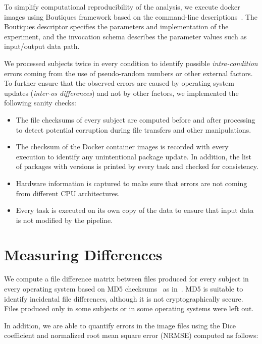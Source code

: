 \documentclass{article}
\begin{document}
{To simplify computational reproducibility of the analysis, we execute 
docker images using Boutiques framework based on the command-line 
descriptions~\cite{glatard2017boutiques}. The Boutiques descriptor 
specifies the parameters and implementation of the experiment, and the 
invocation schema describes the parameter values such as input/output 
data path.

We processed subjects twice in every condition to identify possible 
\emph{intra-condition} errors coming from the use of pseudo-random 
numbers or other external factors. To further ensure that the observed 
errors are caused by operating system updates (\emph{inter-os 
differences}) and not by other factors, we implemented the following 
sanity checks:

\begin{itemize}

\item The file checksums of every subject are computed before and after 
processing to detect potential corruption during file transfers and 
other manipulations. 
\item The checksum of the Docker container images is recorded with
  every execution to identify any unintentional package update. In 
  addition, the list of packages with versions is printed by every task 
  and checked for consistency.
\item Hardware information is captured to make sure that errors are
  not coming from different CPU architectures.
\item Every task is executed on its own copy of the data to ensure
  that input data is not modified by the pipeline. 
\end{itemize}
	

\section{Measuring Differences}

We compute a file difference matrix between files produced for every 
subject in every operating system based on MD5 
checksums~\cite{md51992url} as in~\cite{Scaria2017}. MD5 is suitable to 
identify incidental file differences, although it is not 
cryptographically secure. Files produced only in some subjects or in 
some operating systems were left out.

In addition, we are able to quantify errors in the image files using 
the Dice coefficient and normalized root mean square error (NRMSE) 
computed as follows:

}
\end{document}
